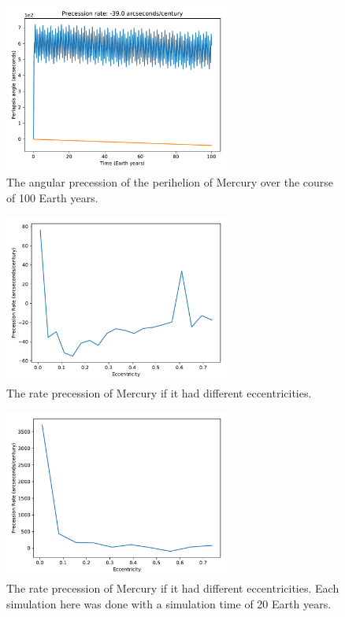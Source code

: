 \documentclass{report}
\begin{document}
            \begin{figure}[h]
                \centering
                \includegraphics[width = 0.66\textwidth]{images/Precession_Angle_100.pdf}
                \caption{The angular precession of the perihelion of Mercury over the course of 100 Earth years.}
                \label{fig:mercury_precession}
            \end{figure}
            
            \begin{figure}[h]
                \centering
                \includegraphics[width = 0.66\textwidth]{images/rate_v_eccentricity.pdf}
                \caption{The rate precession of Mercury if it had different eccentricities.}
                \label{fig:rate_vs_eccentricity}
            \end{figure}
            
            \begin{figure}[h]
                \centering
                \includegraphics[width = 0.66\textwidth]{images/rate_v_eccentricity_final.pdf}
                \caption{The rate precession of Mercury if it had different eccentricities.  Each simulation here was done with a simulation time of 20 Earth years.}
                \label{fig:rate_vs_eccentricity_final}
            \end{figure}
\end{document}
